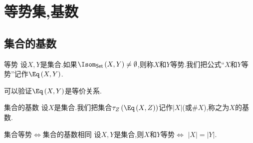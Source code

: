 \chapter{等势集,基数}

\section{集合的基数}

\begin{definition}{等势}{}
	设$X,Y$是集合.如果$\Isom_{\mathsf{Set}}\left(X,Y\right)\neq\emptyset$,则称$X$和$Y$等势.我们把公式``$X$和$Y$等势''记作$\Eq\left(X,Y\right)$.
\end{definition}

\begin{remark}{}{}
	可以验证$\Eq\left(X,Y\right)$是等价关系.
\end{remark}

\begin{definition}{集合的基数}{}
	设$X$是集合.我们把集合$\tau_{Z}\left(\Eq\left(X,Z\right)\right)$记作$\left|X\right|$(或$\# X$),称之为$X$的基数.
\end{definition}

\begin{proposition}{集合等势$\iff$集合的基数相同}{}
	设$X,Y$是集合,则$X$和$Y$等势$\iff$ $\left|X\right|=\left|Y\right|$.
\end{proposition}

